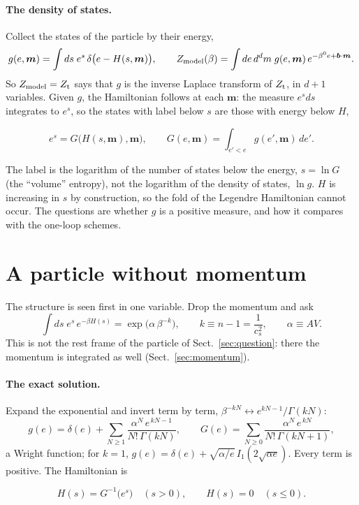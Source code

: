 \documentclass[11pt,aps,preprint,nofootinbib,superscriptaddress,tightenlines]{revtex4-2}
\def\st{\begin{equation}}
\def\stp{\end{equation}}
\def\Sect#1{Sect.~\ref{#1}}
\let\oldparagraph\paragraph
\renewcommand{\paragraph}{\par\bigskip\oldparagraph}
\begin{document}
\paragraph{The density of states.}  Collect the states of the particle by their energy,
\st
g(e,\bm m)=\int ds\;e^{s}\,\delta\big(e-H(s,\bm m)\big),\qquad
Z_{\rm model}(\beta)=\int de\,d^dm\;g(e,\bm m)\,e^{-\beta^0e+\bm b\cdot\bm m}.
\stp
So $Z_{\rm model}=Z_{\rm t}$ says that $g$ is the inverse Laplace transform of $Z_{\rm t}$, in $d+1$ variables.  Given $g$, the Hamiltonian follows
at each $\bm m$: the measure $e^sds$ integrates to $e^{s}$, so the states with label below $s$ are those with energy below $H$,
\begin{keyeq}
\st
e^{s}=G\big(H(s,\bm m),\bm m\big),\qquad G(e,\bm m)=\int_{e'<e}g(e',\bm m)\,de' .
\label{HfromG}
\stp
\end{keyeq}
The label is the logarithm of the number of states below the energy, $s=\ln G$ (the ``volume'' entropy), not the logarithm of the density of
states, $\ln g$.  $H$ is increasing in $s$ by construction, so the fold of the Legendre Hamiltonian cannot occur.  The questions are whether $g$ is a
positive measure, and how it compares with the one-loop schemes.

\section{A particle without momentum}
\label{sec:nomomentum}

The structure is seen first in one variable.  Drop the momentum and ask
\st
\int ds\;e^{s}\,e^{-\beta H(s)}=\exp\!\big(\alpha\,\beta^{-k}\big),\qquad k\equiv n-1=\frac1{c_s^2},\qquad \alpha\equiv AV .
\label{toy}
\stp
This is not the rest frame of the particle of \Sect{sec:question}: there the momentum is integrated as well (\Sect{sec:momentum}).

\paragraph{The exact solution.}  Expand the exponential and invert term by term, $\beta^{-kN}\leftrightarrow e^{kN-1}/\Gamma(kN)$:
\st
g(e)=\delta(e)+\sum_{N\ge1}\frac{\alpha^N\,e^{\,kN-1}}{N!\,\Gamma(kN)},\qquad
G(e)=\sum_{N\ge0}\frac{\alpha^N\,e^{\,kN}}{N!\,\Gamma(kN+1)} ,
\label{Gtoy}
\stp
a Wright function; for $k=1$, $g(e)=\delta(e)+\sqrt{\alpha/e}\,I_1(2\sqrt{\alpha e})$.  Every term is positive.  The Hamiltonian is
\begin{keyeq}
\st
H(s)=G^{-1}\big(e^{s}\big)\quad(s>0),\qquad H(s)=0\quad(s\le0).
\label{Htoy}
\stp
\end{keyeq}
\end{document}
